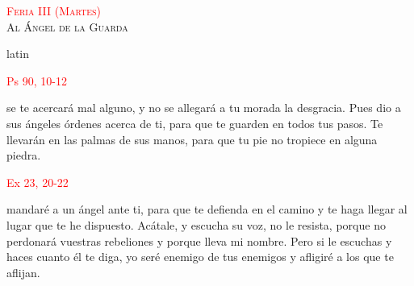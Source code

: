 \documentclass[10pt]{article}
\begin{document}
\begin{multicols}{2}
      \begin{otherlanguage}{latin}
            

            \vspace{1mm}

            
      \end{otherlanguage}


      \begin{center}
            \textsc{\textcolor{red}{Feria III (Martes)}\\ {\large Al Ángel de la Guarda}}
      \end{center}

      \begin{otherlanguage*}{latin}
            
      \end{otherlanguage*}

      \vspace{2mm}

      \hfill\textcolor{red}{Ps 90, 10-12}

      se te acercará mal alguno, y no se allegará a tu morada la desgracia. Pues dio a sus ángeles órdenes acerca de ti, para que te guarden en todos tus pasos.
      Te llevarán en las palmas de sus manos, para que tu pie no tropiece en alguna piedra.
      
      \vspace{2mm}

      \hfill\textcolor{red}{Ex 23, 20-22}
      
      mandaré a un ángel ante ti, para que te defienda en el camino y te haga llegar al lugar que te he dispuesto. Acátale, y escucha su voz,
      no le resista, porque no perdonará vuestras rebeliones y porque lleva mi nombre. Pero si le escuchas y haces cuanto él te diga, yo seré
      enemigo de tus enemigos y afligiré a los que te aflijan.
      
      \vspace{2mm}

      
      \vspace{2mm}


\end{multicols}
\end{document}
